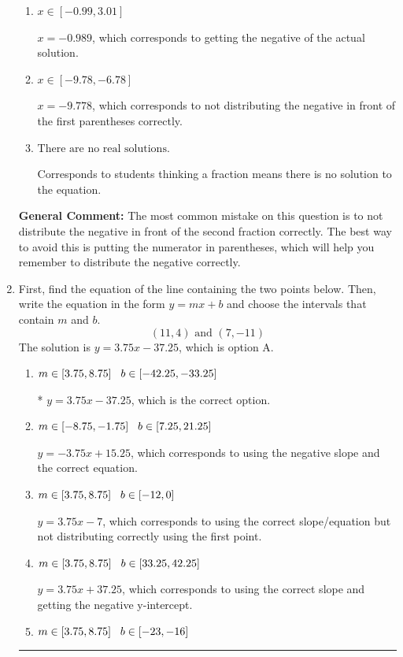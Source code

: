 \documentclass{extbook}[14pt]
\newcommand{\litem}[1]{\item #1

\rule{\textwidth}{0.4pt}}
\begin{document}
\begin{enumerate}
{\begin{enumerate}[label=\Alph*.]
$x = 9.778$, which corresponds to not distributing the negative in front of the second parentheses correctly.
\item \( x \in [-0.99, 3.01] \)

$x = -0.989$, which corresponds to getting the negative of the actual solution.
\item \( x \in [-9.78, -6.78] \)

$x = -9.778$, which corresponds to not distributing the negative in front of the first parentheses correctly.
\item \( \text{There are no real solutions.} \)

Corresponds to students thinking a fraction means there is no solution to the equation.
\end{enumerate}

\textbf{General Comment:} The most common mistake on this question is to not distribute the negative in front of the second fraction correctly. The best way to avoid this is putting the numerator in parentheses, which will help you remember to distribute the negative correctly.
}
\litem{
First, find the equation of the line containing the two points below. Then, write the equation in the form $ y=mx+b $ and choose the intervals that contain $m$ and $b$.
\[ (11, 4) \text{ and } (7, -11) \]The solution is \( y = 3.75x -37.25 \), which is option A.\begin{enumerate}[label=\Alph*.]
\item \( m \in [3.75, 8.75] \hspace*{3mm} b \in [-42.25, -33.25] \)

* $y = 3.75x -37.25$, which is the correct option.
\item \( m \in [-8.75, -1.75] \hspace*{3mm} b \in [7.25, 21.25] \)

 $y = -3.75x + 15.25$, which corresponds to using the negative slope and the correct equation.
\item \( m \in [3.75, 8.75] \hspace*{3mm} b \in [-12, 0] \)

 $y = 3.75x -7$, which corresponds to using the correct slope/equation but not distributing correctly using the first point.
\item \( m \in [3.75, 8.75] \hspace*{3mm} b \in [33.25, 42.25] \)

 $y = 3.75x + 37.25$, which corresponds to using the correct slope and getting the negative y-intercept.
\item \( m \in [3.75, 8.75] \hspace*{3mm} b \in [-23, -16] \)


\end{enumerate}}
\end{enumerate}
\end{document}
